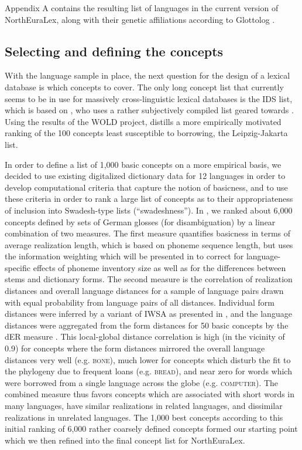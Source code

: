Appendix A contains the resulting list of languages in the current version of NorthEuraLex,
along with their genetic affiliations according to Glottolog \citep{glottolog}.

\subsection{Selecting and defining the concepts}
With the language sample in place, the next question for the design of a lexical database is which concepts to cover. The only long concept list that currently seems to be in use for massively cross-linguistic lexical databases is the IDS list, which is based on \cite{buck1949}, who uses a rather subjectively compiled list geared towards . Using the results of the WOLD project, \cite{tadmor2009} distills a more empirically motivated ranking of the 100 concepts least susceptible to borrowing, the Leipzig-Jakarta list.

In order to define a list of 1,000 basic concepts on a more empirical basis, we decided to use existing digitalized dictionary data for 12 languages in order to develop computational criteria that capture the notion of basicness, and to use these criteria in order to rank a large list of concepts as to their appropriateness of inclusion into Swadesh-type lists (``swadeshness''). In \cite{dellert_buch_2015}, we ranked about 6,000 concepts defined by sets of German glosses (for disambiguation) by a linear combination of two measures. The first measure quantifies basicness in terms of average realization length, which is based on phoneme sequence length, but uses the information weighting which will be presented in  to correct for language-specific effects of phoneme inventory size as well as for the differences between stems and dictionary forms. The second measure is the correlation of realization distances and overall language distances for a sample of language pairs drawn with equal probability
from language pairs of all distances. Individual form distances were inferred by a variant of IWSA as presented in , and the language distances were aggregated from the form distances for 50 basic concepts by the dER measure \citep{jaeger2013}. This local-global distance correlation is high (in the vicinity of 0.9) for concepts where the form distances mirrored the overall language distances very well (e.g. \textsc{bone}), much lower for concepts which disturb the fit to the phylogeny due to frequent loans (e.g. \textsc{bread}), and near zero for words which were borrowed from a single language across the globe (e.g. \textsc{computer}). The combined measure thus favors concepts which are associated with short words in many languages, have similar realizations in related languages, and dissimilar realizations in unrelated languages. The 1,000 best concepts according to this initial ranking of 6,000 rather coarsely defined concepts formed our starting point which we then refined into the final concept list for NorthEuraLex.

